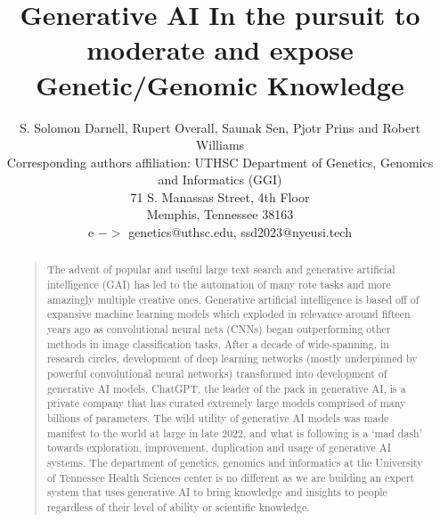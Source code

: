 \documentclass[letterpaper]{article}
\begin{document}
%
\title{Generative AI In the pursuit to moderate and expose\\ Genetic/Genomic Knowledge}
\author{S. Solomon Darnell, Rupert Overall, Saunak Sen, Pjotr Prins and Robert Williams\\
Corresponding authors affiliation: UTHSC Department of Genetics, Genomics and Informatics (GGI)\\
71 S. Manassas Street, 4th Floor\\
Memphis, Tennessee 38163\\
e $->$ genetics@uthsc.edu, ssd2023@nyeusi.tech
}
\maketitle
\begin{abstract}
\begin{quote}
The advent of popular and useful large text search and generative artificial intelligence (GAI) has led to the automation of many rote tasks and more amazingly multiple creative ones.
Generative artificial intelligence is based off of expansive machine learning models which exploded in relevance around fifteen years ago as convolutional neural nets (CNNs) began outperforming other methods in image classification tasks.
After a decade of wide-spanning, in research circles, development of deep learning networks (mostly underpinned by powerful convolutional neural networks) transformed into development of generative AI models.
ChatGPT, the leader of the pack in generative AI, is a private company that has curated extremely large models comprised of many billions of parameters.
The wild utility of generative AI models was made manifest to the world at large in late 2022, and what is following is a `mad dash' towards exploration, improvement, duplication and usage of generative AI systems. 
The department of genetics, genomics and informatics at the University of Tennessee Health Sciences center is no different as we are building an expert system that uses generative AI to bring knowledge and insights to people regardless of their level of ability or scientific knowledge.
\end{quote}
\end{abstract}





%







%


\end{document}
